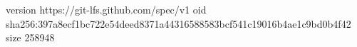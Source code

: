 version https://git-lfs.github.com/spec/v1
oid sha256:397a8ecf1bc722e54deed8371a44316588583bcf541c19016b4ae1c9bd0b4f42
size 258948
